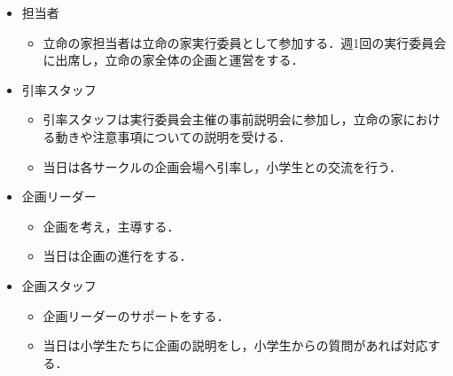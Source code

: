 \begin{itemize}
 \item 担当者
  \begin{itemize}
  \item 立命の家担当者は立命の家実行委員として参加する．週1回の実行委員会に出席し，立命の家全体の企画と運営をする．
  \end{itemize}
 \item 引率スタッフ
　\begin{itemize}
  \item 引率スタッフは実行委員会主催の事前説明会に参加し，立命の家における動きや注意事項についての説明を受ける．
  \item 当日は各サークルの企画会場へ引率し，小学生との交流を行う．
  \end{itemize}
 \item 企画リーダー
  \begin{itemize}
  \item 企画を考え，主導する．
  \item 当日は企画の進行をする．
  \end{itemize}
 \item 企画スタッフ
  \begin{itemize}
  \item 企画リーダーのサポートをする．
  \item 当日は小学生たちに企画の説明をし，小学生からの質問があれば対応する．
  \end{itemize}
\end{itemize}
